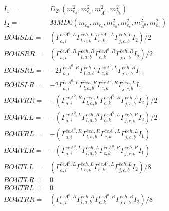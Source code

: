 \documentclass[A4,landscape]{article}
\begin{document}
\begin{align} 
I_1 = & D_{27}(m^2_{e_{{a}}}, m^2_{e_{{c}}}, m^2_{A^0}, m^2_{h_{{b}}}) \\ 
I_2 = & MMD0(m_{e_{{a}}}, m_{e_{{c}}}, m^2_{e_{{a}}}, m^2_{e_{{c}}}, m^2_{A^0}, m^2_{h_{{b}}}) \\ 
  BO4lSLL= & ( \Gamma^{\bar{e}e A^0 ,L}_{a, i} \Gamma^{\bar{e}e h ,L}_{l, a, b} \Gamma^{\bar{e}e A^0 ,L}_{c, k} \Gamma^{\bar{e}e h ,L}_{j, c, b} I_2)/2 \\ 
  BO4lSRR= & ( \Gamma^{\bar{e}e A^0 ,R}_{a, i} \Gamma^{\bar{e}e h ,R}_{l, a, b} \Gamma^{\bar{e}e A^0 ,R}_{c, k} \Gamma^{\bar{e}e h ,R}_{j, c, b} I_2)/2 \\ 
  BO4lSRL= & -2  \Gamma^{\bar{e}e A^0 ,R}_{a, i} \Gamma^{\bar{e}e h ,L}_{l, a, b} \Gamma^{\bar{e}e A^0 ,L}_{c, k} \Gamma^{\bar{e}e h ,R}_{j, c, b} I_1 \\ 
  BO4lSLR= & -2  \Gamma^{\bar{e}e A^0 ,L}_{a, i} \Gamma^{\bar{e}e h ,R}_{l, a, b} \Gamma^{\bar{e}e A^0 ,R}_{c, k} \Gamma^{\bar{e}e h ,L}_{j, c, b} I_1 \\ 
  BO4lVRR= & -( \Gamma^{\bar{e}e A^0 ,R}_{a, i} \Gamma^{\bar{e}e h ,L}_{l, a, b} \Gamma^{\bar{e}e A^0 ,R}_{c, k} \Gamma^{\bar{e}e h ,L}_{j, c, b} I_2)/2 \\ 
  BO4lVLL= & -( \Gamma^{\bar{e}e A^0 ,L}_{a, i} \Gamma^{\bar{e}e h ,R}_{l, a, b} \Gamma^{\bar{e}e A^0 ,L}_{c, k} \Gamma^{\bar{e}e h ,R}_{j, c, b} I_2)/2 \\ 
  BO4lVRL= & -( \Gamma^{\bar{e}e A^0 ,R}_{a, i} \Gamma^{\bar{e}e h ,R}_{l, a, b} \Gamma^{\bar{e}e A^0 ,L}_{c, k} \Gamma^{\bar{e}e h ,L}_{j, c, b} I_1) \\ 
  BO4lVLR= & -( \Gamma^{\bar{e}e A^0 ,L}_{a, i} \Gamma^{\bar{e}e h ,L}_{l, a, b} \Gamma^{\bar{e}e A^0 ,R}_{c, k} \Gamma^{\bar{e}e h ,R}_{j, c, b} I_1) \\ 
  BO4lTLL= & ( \Gamma^{\bar{e}e A^0 ,L}_{a, i} \Gamma^{\bar{e}e h ,L}_{l, a, b} \Gamma^{\bar{e}e A^0 ,L}_{c, k} \Gamma^{\bar{e}e h ,L}_{j, c, b} I_2)/8 \\ 
  BO4lTLR= & 0 \\ 
  BO4lTRL= & 0 \\ 
  BO4lTRR= & ( \Gamma^{\bar{e}e A^0 ,R}_{a, i} \Gamma^{\bar{e}e h ,R}_{l, a, b} \Gamma^{\bar{e}e A^0 ,R}_{c, k} \Gamma^{\bar{e}e h ,R}_{j, c, b} I_2)/8 \\ 
\end{align} 
\end{document}

